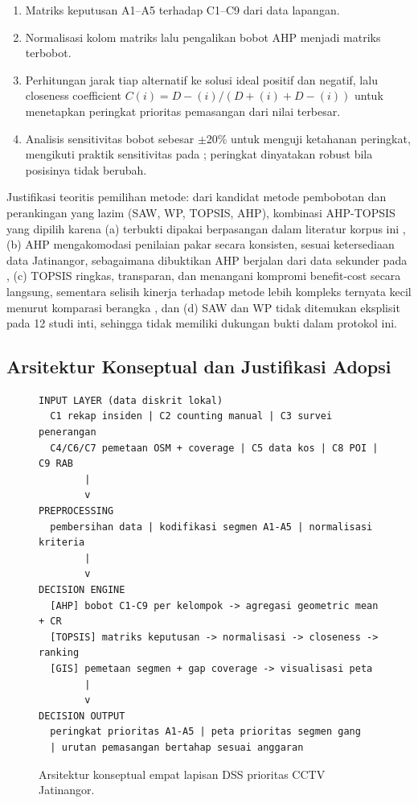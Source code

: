 \documentclass[conference]{IEEEtran}
\begin{document}
\begin{enumerate}
\item Matriks keputusan A1--A5 terhadap C1--C9 dari data lapangan.
\item Normalisasi kolom matriks lalu pengalikan bobot AHP menjadi matriks terbobot.
\item Perhitungan jarak tiap alternatif ke solusi ideal positif dan negatif, lalu closeness coefficient $C(i) = D-(i)/(D+(i) + D-(i))$ untuk menetapkan peringkat prioritas pemasangan dari nilai terbesar.
\item Analisis sensitivitas bobot sebesar $\pm$20\% untuk menguji ketahanan peringkat, mengikuti praktik sensitivitas pada \cite{baddour2026}; peringkat dinyatakan robust bila posisinya tidak berubah.
\end{enumerate}

Justifikasi teoritis pemilihan metode: dari kandidat metode pembobotan dan perankingan yang lazim (SAW, WP, TOPSIS, AHP), kombinasi AHP-TOPSIS yang dipilih karena (a) terbukti dipakai berpasangan dalam literatur korpus ini \cite{kanj2024}, (b) AHP mengakomodasi penilaian pakar secara konsisten, sesuai ketersediaan data Jatinangor, sebagaimana dibuktikan AHP berjalan dari data sekunder pada \cite{shiddiqy2025}, (c) TOPSIS ringkas, transparan, dan menangani kompromi benefit-cost secara langsung, sementara selisih kinerja terhadap metode lebih kompleks ternyata kecil menurut komparasi berangka \cite{baddour2026}, dan (d) SAW dan WP tidak ditemukan eksplisit pada 12 studi inti, sehingga tidak memiliki dukungan bukti dalam protokol ini.

\subsection{Arsitektur Konseptual dan Justifikasi Adopsi}

\begin{figure}[!t]
\centering
\begin{small}
\begin{verbatim}
INPUT LAYER (data diskrit lokal)
  C1 rekap insiden | C2 counting manual | C3 survei penerangan
  C4/C6/C7 pemetaan OSM + coverage | C5 data kos | C8 POI | C9 RAB
        |
        v
PREPROCESSING
  pembersihan data | kodifikasi segmen A1-A5 | normalisasi kriteria
        |
        v
DECISION ENGINE
  [AHP] bobot C1-C9 per kelompok -> agregasi geometric mean + CR
  [TOPSIS] matriks keputusan -> normalisasi -> closeness -> ranking
  [GIS] pemetaan segmen + gap coverage -> visualisasi peta
        |
        v
DECISION OUTPUT
  peringkat prioritas A1-A5 | peta prioritas segmen gang
  | urutan pemasangan bertahap sesuai anggaran
\end{verbatim}
\end{small}
\caption{Arsitektur konseptual empat lapisan DSS prioritas CCTV Jatinangor.}
\label{fig:arsitektur}
\end{figure}
\end{document}
